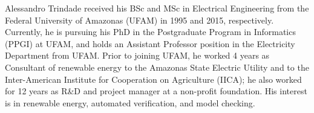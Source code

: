 \documentclass[journal]{IEEEtran}
\begin{document}
%
%
%

{}
%
%
%
% 
\begin{IEEEbiography}
    {Alessandro Trindade}
received his BSc and MSc in Electrical Engineering from the Federal University of Amazonas (UFAM) in 1995 and 2015, respectively. Currently, he is pursuing his PhD in the Postgraduate Program in Informatics (PPGI) at UFAM, and holds an Assistant Professor position in the Electricity Department from UFAM. Prior to joining UFAM, he worked 4 years as Consultant of renewable energy to the Amazonas State Electric Utility and to the Inter-American Institute for Cooperation on Agriculture (IICA); he also worked for 12 years as R\&D and project manager at a non-profit foundation. His interest is in renewable energy, automated verification, and model checking.
\end{IEEEbiography}
\end{document}
